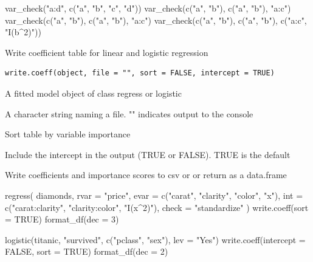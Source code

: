 \documentclass[a4paper]{book}
\begin{document}
%
\begin{Examples}
\begin{ExampleCode}
var_check("a:d", c("a", "b", "c", "d"))
var_check(c("a", "b"), c("a", "b"), "a:c")
var_check(c("a", "b"), c("a", "b"), "a:c")
var_check(c("a", "b"), c("a", "b"), c("a:c", "I(b^2)"))

\end{ExampleCode}
\end{Examples}
%
\begin{Description}
Write coefficient table for linear and logistic regression
\end{Description}
%
\begin{Usage}
\begin{verbatim}
write.coeff(object, file = "", sort = FALSE, intercept = TRUE)
\end{verbatim}
\end{Usage}
%
\begin{Arguments}
\begin{ldescription}
\item[\code{object}] A fitted model object of class regress or logistic

\item[\code{file}] A character string naming a file. "" indicates output to the console

\item[\code{sort}] Sort table by variable importance

\item[\code{intercept}] Include the intercept in the output (TRUE or FALSE). TRUE is the default
\end{ldescription}
\end{Arguments}
%
\begin{Details}
Write coefficients and importance scores to csv or or return as a data.frame
\end{Details}
%
\begin{Examples}
\begin{ExampleCode}

regress(
  diamonds,
  rvar = "price", evar = c("carat", "clarity", "color", "x"),
  int = c("carat:clarity", "clarity:color", "I(x^2)"), check = "standardize"
) %
  write.coeff(sort = TRUE) %
  format_df(dec = 3)

logistic(titanic, "survived", c("pclass", "sex"), lev = "Yes") %
  write.coeff(intercept = FALSE, sort = TRUE) %
  format_df(dec = 2)
\end{ExampleCode}
\end{Examples}
\printindex{}
\end{document}
